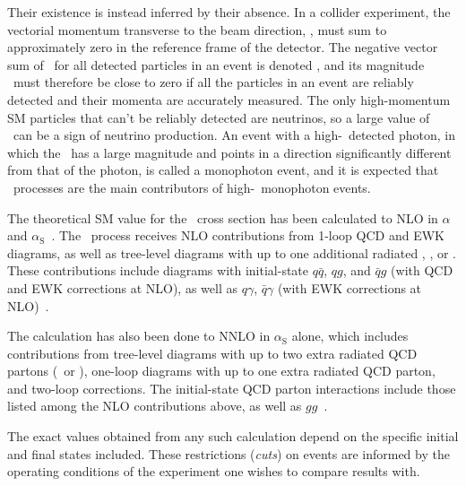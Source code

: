 Their existence is instead inferred by their absence.
In a collider experiment, the vectorial momentum transverse to the beam direction, \vecpT, must sum to approximately zero in the reference frame of the
detector. The negative vector sum of \vecpT\ for all detected particles in an event is denoted \vecMET, and its magnitude \MET\ must therefore be close
to zero if all the particles in an event are reliably detected and their momenta are accurately measured. The only high-momentum SM particles that can't
be reliably detected are neutrinos, so a large value of \MET\ can be a sign of neutrino production. An event with a high-\pT\ detected photon, in which
the \vecMET\ has a large magnitude and points in a direction significantly different from that of the photon, is called a monophoton event, and it is
expected that \zinvg\ processes are the main contributors of high-\pT\ monophoton events.

The theoretical SM value for the \zinvg\ cross section has been calculated to NLO in $\alpha$ and $\alpha_\mathrm{S}$~\cite{ref:JHEP04(2015)018, ref:JHEP02(2016)057}.
The \zinvg\ process receives NLO contributions from 1-loop QCD and EWK diagrams, as well as tree-level diagrams with up to one additional radiated \Pgamma, \Pq, or \Pg.
These contributions include diagrams with initial-state $q\bar{q}$, $qg$, and $\bar{q}g$ (with QCD and EWK corrections at NLO), as well as $q\gamma$, $\bar{q}\gamma$ (with EWK corrections
at NLO)~\cite{ref:JHEP02(2016)057}.

The calculation has also been done to NNLO in $\alpha_\mathrm{S}$ alone,
which includes contributions from tree-level diagrams with up to two extra radiated QCD partons (\Pq\ or \Pg), one-loop diagrams with up to one extra
radiated QCD parton, and two-loop corrections. The initial-state QCD parton interactions include those listed among the NLO contributions above,
as well as $gg$~\cite{ref:j.physletb.2014.02.037, ref:JHEP07(2015)085}.

The exact values obtained from any such calculation depend on the specific initial and final states included. These restrictions (\textit{cuts}) on events are
informed by the operating conditions of the experiment one wishes to compare results with.

